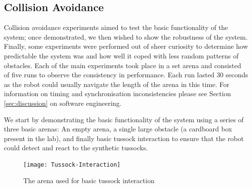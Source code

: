 \documentclass[a4paper,11pt,twoside,openright]{article}
\begin{document}
\subsection{Collision Avoidance}
Collision avoidance experiments aimed to test the basic functionality of the system; once demonstrated, we then wished to show
the robustness of the system. Finally, some experiments were performed out of sheer curiosity to determine how predictable the
system was and how well it coped with less random patterns of obstacles.
Each of the main experiments took place in a set arena and consisted of five runs to observe the consistency in performance.
Each run lasted 30 seconds as the robot could usually navigate the length of the arena in this time. For information on timing
and synchronisation inconsistencies please see Section \ref{sec:discussion} on software engineering.
\newline

We start by demonstrating the basic functionality of the system using a series of three basic arenas: An empty arena, a single large obstacle
(a cardboard box present in the lab), and finally basic tussock interaction to ensure that the robot could detect and react to the synthetic
tussocks.

\begin{figure}[h]
  \centering
  \texttt{[image: Tussock-Interaction]}
  \caption{
    \label{fig:tussock-interaction} The arena used for basic tussock interaction
  }
\end{figure}
\end{document}
